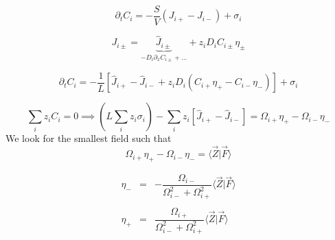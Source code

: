 \documentclass[aps,12pt]{revtex4}
\begin{document}
\begin{equation}
	\partial_t C_i = -\dfrac{S}{V}(J_{i+}-J_{i-}) + \sigma_i
\end{equation}

\begin{equation}
	J_{i\pm} = \underbrace{\hat J_{i\pm}}_{-D_i \partial_x C_{i\pm}+\ldots} + z_i D_i C_{i\pm} \eta_\pm
\end{equation}

\begin{equation}
	\partial_t C_i = -\dfrac{1}{L} \left[ \hat J_{i+}- \hat J_{i-} + z_i D_i (C_{i+} \eta_+ - C_{i-} \eta_-) \right] + \sigma_i
\end{equation}

\begin{equation}
	\sum_i z_i C_i = 0 \implies \left(L \sum_i z_i \sigma_i\right) - \sum_i z_i \left[ \hat J_{i+}- \hat J_{i-} \right] = 
	\Omega_{i+} \eta_+ - \Omega_{i-} \eta_-
\end{equation}
We look for the smallest field such that 
\begin{equation}
\Omega_{i+} \eta_+ - \Omega_{i-} \eta_- = \langle \vec Z \vert \vec F \rangle
\end{equation}

\begin{equation}
\begin{array}{rcl}
	\eta_- & = & -\dfrac{\Omega_{i-}}{ \Omega_{i-}^2 + \Omega_{i+}^2} \langle \vec Z \vert \vec F \rangle \\
	\\
 	\eta_+ & = &  \dfrac{\Omega_{i+}}{ \Omega_{i-}^2 + \Omega_{i+}^2} \langle \vec Z \vert \vec F \rangle \\
\end{array}
\end{equation}
\end{document}
